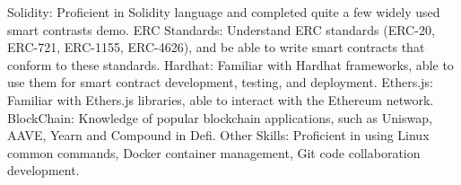 

\begin{cvskills}

\cvskill
{Solidity:} %
{Proficient in Solidity language and completed quite a few widely used smart contrasts demo.} %
\cvskill
{ERC Standards:} %
{Understand ERC standards (ERC-20, ERC-721, ERC-1155, ERC-4626), and be able to write smart contracts that conform to these standards.} %
\cvskill
{Hardhat:} %
{Familiar with Hardhat frameworks, able to use them for smart contract development, testing, and deployment.} %
\cvskill
{Ethers.js: } %
{Familiar with Ethers.js libraries, able to interact with the Ethereum network.} %
\cvskill
{BlockChain: } %
{Knowledge of popular blockchain applications, such as Uniswap, AAVE, Yearn and Compound in Defi.} %
\cvskill
{Other Skills: } %
{Proficient in using Linux common commands, Docker container management, Git code collaboration development.} %

\end{cvskills}
